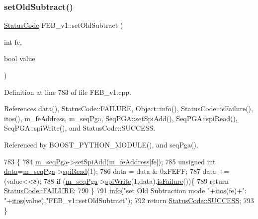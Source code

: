 \subsubsection{\texorpdfstring{set\+Old\+Subtract()}{setOldSubtract()}}
{\footnotesize\ttfamily \hyperlink{classStatusCode}{Status\+Code} F\+E\+B\+\_\+v1\+::set\+Old\+Subtract (\begin{DoxyParamCaption}\item[{int}]{fe,  }\item[{bool}]{value }\end{DoxyParamCaption})}



Definition at line 783 of file F\+E\+B\+\_\+v1.\+cpp.



References data(), Status\+Code\+::\+F\+A\+I\+L\+U\+RE, Object\+::info(), Status\+Code\+::is\+Failure(), itos(), m\+\_\+fe\+Address, m\+\_\+seq\+Pga, Seq\+P\+G\+A\+::set\+Spi\+Add(), Seq\+P\+G\+A\+::spi\+Read(), Seq\+P\+G\+A\+::spi\+Write(), and Status\+Code\+::\+S\+U\+C\+C\+E\+SS.



Referenced by B\+O\+O\+S\+T\+\_\+\+P\+Y\+T\+H\+O\+N\+\_\+\+M\+O\+D\+U\+L\+E(), and seq\+Pga().


\begin{DoxyCode}
783                                                      \{
784   \hyperlink{classFEB__v1_a6c7804ac86796f233a8393043adf2e77}{m\_seqPga}->\hyperlink{classSeqPGA_ac998ce3a6d9b5f2e88cc8393f8c1df53}{setSpiAdd}(\hyperlink{classFEB__v1_a4e1945c2d5b434125f375e9d0fc6d99f}{m\_feAddress}[fe]);
785   \textcolor{keywordtype}{unsigned} \textcolor{keywordtype}{int} \hyperlink{classFEB__v1_a6bca4320bd3bbbc32efc81097f33421a}{data}=\hyperlink{classFEB__v1_a6c7804ac86796f233a8393043adf2e77}{m\_seqPga}->\hyperlink{classSeqPGA_ab3d0e5e5d4014bc7a92588a76b8713d4}{spiRead}(1);
786   data = data & 0xFEFF;
787   data += (value<<8);
788   \textcolor{keywordflow}{if} (\hyperlink{classFEB__v1_a6c7804ac86796f233a8393043adf2e77}{m\_seqPga}->\hyperlink{classSeqPGA_ad4421841ce4ce8b88ad13f63216f0743}{spiWrite}(1,data).\hyperlink{classStatusCode_a5dd22dc6eb2c52fc4cabc58f6dea2eb7}{isFailure}())\{
789     \textcolor{keywordflow}{return} \hyperlink{classStatusCode_a6f565cbeadc76d14c72f047e5e85eb4ba3da73d4c469762eb9d3c960368252b26}{StatusCode::FAILURE};
790   \}
791   \hyperlink{classObject_a644fd329ea4cb85f54fa6846484b84a8}{info}(\textcolor{stringliteral}{"set Old Subtraction mode "}+\hyperlink{Tools_8h_af330027dbdafb9a30768b3613c553e60}{itos}(fe)+\textcolor{stringliteral}{": "}+\hyperlink{Tools_8h_af330027dbdafb9a30768b3613c553e60}{itos}(value),\textcolor{stringliteral}{"FEB\_v1::setOldSubtract"});
792   \textcolor{keywordflow}{return} \hyperlink{classStatusCode_a6f565cbeadc76d14c72f047e5e85eb4badd0da38d3ba0d922efd1f4619bc37ad8}{StatusCode::SUCCESS};
793 \}
\end{DoxyCode}
\mbox{\label{classFEB__v1_ae94205e374c3438e910aa39a889ebf5c}} 
